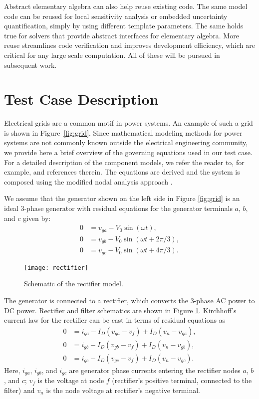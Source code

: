 \documentclass[10pt]{ijnam}
\theoremstyle{definition}
\begin{document}
Abstract elementary algebra can also help reuse existing code. The same model code
can be reused for local sensitivity analysis or embedded uncertainty 
quantification, simply by using different template parameters. The same 
holds true for solvers that provide abstract interfaces for elementary 
algebra. More reuse streamlines code verification and improves 
development efficiency, which are critical for any large scale 
computation. All of these will be pursued in subsequent work.

\appendix

\section{Test Case Description} \label{sec:RectifierInverter}

Electrical grids  are a common motif in power systems. An example of such a grid is shown in Figure~\ref{fig:grid}.
Since mathematical modeling methods for power 
systems are not commonly known outside the electrical engineering 
community, we provide here a brief overview of the governing 
equations used in our test case. For a detailed description of 
the component models, we refer the reader to, for example, \cite{erickson2001}
and references therein. The equations are derived and the system 
is composed using the modified nodal analysis approach \cite{riaza2008}.

We assume that the generator shown on the left side in Figure \ref{fig:grid} 
is an ideal 3-phase generator with residual equations for the generator terminals $a$, $b$, and $c$ given by:
\begin{align}
    0 &= v_{ga} - V_0 \sin (\omega t),  \label{eq:first} \\
    0 &= v_{gb} - V_0 \sin (\omega t + 2\pi / 3),        \\
    0 &= v_{gc} - V_0 \sin (\omega t + 4\pi / 3).
\end{align}

\begin{figure}[htb]
    \centering
    \texttt{[image: rectifier]}
    \caption{Schematic of the rectifier model.}
    \label{fig:rectifier}
\end{figure}

The generator is connected to a rectifier, which converts the 3-phase 
AC power to DC power. Rectifier and filter schematics are shown in
Figure \ref{fig:rectifier}. 
Kirchhoff's current law for the rectifier can be cast in terms of 
residual equations as
\begin{align}
    0 &= i_{ga} - I_D(v_{ga} - v_f) + I_D(v_n - v_{ga}), \\
    0 &= i_{gb} - I_D(v_{gb} - v_f) + I_D(v_n - v_{gb}), \\
    0 &= i_{gc} - I_D(v_{gc} - v_f) + I_D(v_n - v_{gc}).
\end{align}
Here, $i_{ga}$, $i_{gb}$, and $i_{gc}$ are generator phase currents 
entering the rectifier nodes $a$, $b$, and $c$;
$v_f$ is the voltage at node $f$ (rectifier's positive terminal,
connected to the filter) and $v_n$ is the node voltage at 
rectifier's negative terminal. 
\end{document}
